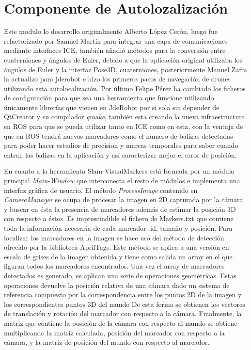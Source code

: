 \section{Componente de Autolozalización} 
\hspace{1cm} Este modulo lo desarrollo originalmente Alberto López Cerón, luego fue refactorizado por Samuel Martín para integrar una capa de comunicaciones mediante interfaces ICE, también añadió métodos para la conversión entre cuaterniones y ángulos de Euler, debido a que la aplicación original utilizaba los ángulos de Euler y la interfaz Pose3D, cuaterniones, posteriormente Manuel Zafra la actualizo para jderobot e hizo los primeros pasos de navegación de drones utilizando esta autolocalización. Por último Felipe Pérez ha cambiado los ficheros de configuración para que sea una herramienta que funcione utilizando únicamente librerías que vienen en JdeRobot por si sola sin depender de QtCreator y su compilador \textit{qmake}, también esta creando la nueva infraestructura en ROS para que se pueda utilizar tanto en ICE como en esta, con la ventaja de que en ROS tendrá nuevos marcadores como el numero de balizas detectadas para poder hacer estudios de precision y marcas temporales para saber cuando entran las balizas en la aplicación y así caracterizar mejor el error de posición. 

\hspace{1cm} En cuanto a la herramienta Slam-VisualMarkers  está formada por un módulo principal \textit{Main-Window} que interconecta el resto de módulos e implementa una interfaz gráfica de usuario. El método \textit{ProcessImage} contenido en \textit{CameraManager} se ocupa de procesar la imagen en 2D capturada por la cámara y buscar en ésta la presencia de marcadores además de estimar la posición 3D con respecto a éstos. Es imprescindible el fichero de Markers.txt que contiene toda la información necesaria de cada marcador: id, tamaño y posición. Para localizar los marcadores en la imagen se hace uso del método de detección ofrecido por la biblioteca AprilTags. Este método se aplica a una versión en escala de grises de la imagen obtenida y tiene como salida un array en el que figuran todos los marcadores encontrados. Una vez el array de marcadores detectados es generado, se aplican una serie de operaciones geométricas. Estas operaciones devuelve la posición relativa de una cámara dado un sistema de referencia compuesto por la correspondencia entre los puntos 2D de la imagen y los correspondientes puntos 3D del mundo De esta forma se obtienen los vectores de translación y rotación del marcador con respecto a la cámara. Finalmente, la matriz que contiene la posición de la cámara con respecto al mundo se obtiene multiplicando la matriz calculada, posición del marcador con respecto a la cámara, y la matriz de posición del mundo con respecto al marcador. 

